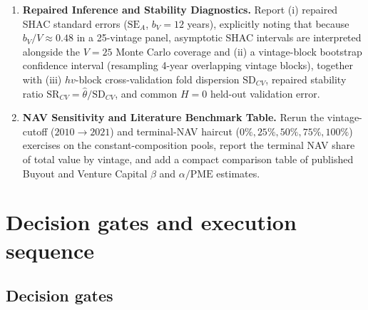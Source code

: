 \documentclass[11pt]{article}
\begin{document}
\begin{enumerate}
\item \textbf{Repaired Inference and Stability Diagnostics.} Report (i) repaired SHAC standard errors ($\mathrm{SE}_A$, $b_V=12$ years), explicitly noting that because $b_V/V\approx 0.48$ in a 25-vintage panel, asymptotic SHAC intervals are interpreted alongside the $V=25$ Monte Carlo coverage and (ii) a vintage-block bootstrap confidence interval (resampling 4-year overlapping vintage blocks), together with (iii) $hv$-block cross-validation fold dispersion $\mathrm{SD}_{CV}$, repaired stability ratio $\mathrm{SR}_{CV}=\hat\theta/\mathrm{SD}_{CV}$, and common $H=0$ held-out validation error.
\item \textbf{NAV Sensitivity and Literature Benchmark Table.} Rerun the vintage-cutoff ($2010\to 2021$) and terminal-NAV haircut ($0\%,25\%,50\%,75\%,100\%$) exercises on the constant-composition pools, report the terminal NAV share of total value by vintage, and add a compact comparison table of published Buyout and Venture Capital $\beta$ and $\alpha/\text{PME}$ estimates.
\end{enumerate}

\section{Decision gates and execution sequence}
\label{sec:gates}
\label{sec:sequence}

\subsection{Decision gates}
\end{document}
